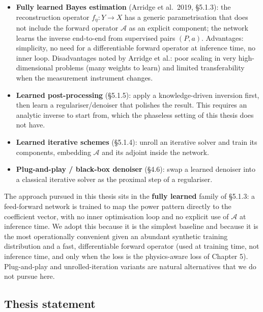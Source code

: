 \documentclass[
  english,
  11pt,
]{report}
\providecommand{\tightlist}{%
  \setlength{\itemsep}{0pt}\setlength{\parskip}{0pt}}
\begin{document}
\begin{itemize}
\tightlist
\item
  \textbf{Fully learned Bayes estimation} (Arridge et al.~2019, §5.1.3):
  the reconstruction operator \(f_\eta \colon Y \to X\) has a generic
  parametrisation that does not include the forward operator
  \(\mathcal A\) as an explicit component; the network learns the
  inverse end-to-end from supervised pairs \((P, a)\). Advantages:
  simplicity, no need for a differentiable forward operator at inference
  time, no inner loop. Disadvantages noted by Arridge et al.: poor
  scaling in very high-dimensional problems (many weights to learn) and
  limited transferability when the measurement instrument changes.
\item
  \textbf{Learned post-processing} (§5.1.5): apply a knowledge-driven
  inversion first, then learn a regulariser/denoiser that polishes the
  result. This requires an analytic inverse to start from, which the
  phaseless setting of this thesis does not have.
\item
  \textbf{Learned iterative schemes} (§5.1.4): unroll an iterative
  solver and train its components, embedding \(\mathcal A\) and its
  adjoint inside the network.
\item
  \textbf{Plug-and-play / black-box denoiser} (§4.6): swap a learned
  denoiser into a classical iterative solver as the proximal step of a
  regulariser.
\end{itemize}

The approach pursued in this thesis sits in the \textbf{fully learned}
family of §5.1.3: a feed-forward network is trained to map the power
pattern directly to the coefficient vector, with no inner optimisation
loop and no explicit use of \(\mathcal A\) at inference time. We adopt
this because it is the simplest baseline and because it is the most
operationally convenient given an abundant synthetic training
distribution and a fast, differentiable forward operator (used at
training time, not inference time, and only when the loss is the
physics-aware loss of Chapter 5). Plug-and-play and unrolled-iteration
variants are natural alternatives that we do not pursue here.

\subsection{Thesis statement}\label{thesis-statement}
\end{document}
